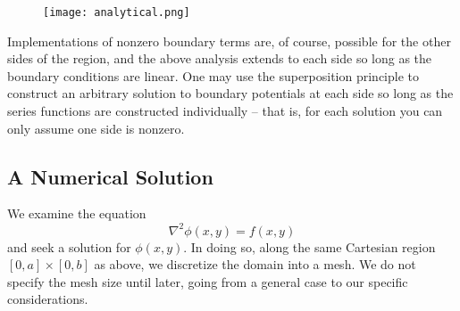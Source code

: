 \documentclass[reprint, amsmath, amssymb, aps, floatfix]{revtex4-1}
\begin{document}
\begin{figure}[H]
	\hspace{-1cm}
	\texttt{[image: analytical.png]}
	\label{analytical}
\end{figure}

Implementations of nonzero boundary terms are, of course, possible for the other sides of the region, and the above analysis extends to each side so long as the boundary conditions are linear. One may use the superposition principle to construct an arbitrary solution to boundary potentials at each side so long as the series functions are constructed individually -- that is, for each solution you can only assume one side is nonzero.

\subsection{A Numerical Solution}

We examine the equation \begin{equation}
\nabla^2\phi(x,y)=f(x,y) \label{sourceeq}
\end{equation} and seek a solution for $\phi(x,y)$.
In doing so, along the same Cartesian region $[0,a]\times [0,b]$ as above, we discretize the domain into a mesh. We do not specify the mesh size until later, going from a general case to our specific considerations.
\end{document}
